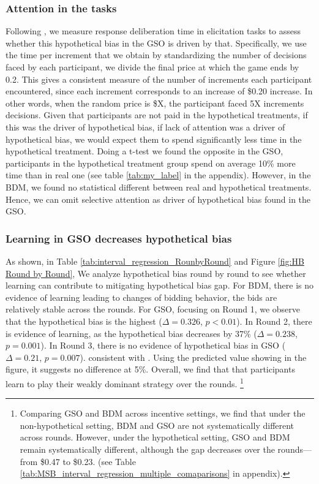 \documentclass[12pt]{article}
\begin{document}
\subsubsection{Attention in the tasks}

Following \citet{chabris2008measuring}, we measure response deliberation time in elicitation tasks to assess whether this hypothetical bias in the GSO is driven by that. Specifically, we use the time per increment that we obtain by standardizing the number of decisions faced by each participant, we divide the final price at which the game ends by 0.2. This gives a consistent measure of the number of increments each participant encountered, since each increment corresponds to an increase of \$0.20 increase. In other words, when the random price is \$X, the participant faced 5X increments decisions. Given that participants are not paid in the hypothetical treatments, if this was the driver of hypothetical bias, if lack of attention was a driver of hypothetical bias, we would expect them to spend significantly less time in the hypothetical treatment. Doing a t-test we found the opposite in the GSO, participants in the hypothetical treatment group spend on average 10\% more time than in real one (see table \ref{tab:my_label} in the appendix).  However, in the BDM, we found no statistical different between real and hypothetical treatments. Hence, we can omit selective attention as driver of hypothetical bias found in the GSO.










\subsubsection{Learning in GSO decreases hypothetical bias}
As shown, in Table \ref{tab:interval_regression_RounbyRound} and Figure \ref{fig:HB Round by Round}, We analyze hypothetical bias round by round to see whether learning can contribute to mitigating hypothetical bias gap. For BDM, there is no evidence of learning leading to changes of bidding behavior, the bids are relatively stable across the rounds.
For GSO, focusing on Round 1, we observe that the hypothetical bias is the highest (\(\Delta = 0.326\), \(p < 0.01\)). In Round 2, there is evidence of learning, as the hypothetical bias decreases by 37\% (\(\Delta = 0.238\), \(p = 0.001\)). In Round 3, there is no evidence of hypothetical bias in GSO (\(\Delta = 0.21\), \(p = 0.007\)). consistent with \citet{brown_is_2023}. Using the predicted value showing in the figure, it suggests no difference at 5\%. Overall, we find that that participants learn to play their weakly dominant strategy over the rounds. \footnote{Comparing GSO and BDM across incentive settings, we find that under the non-hypothetical setting, BDM and GSO are not systematically different across rounds. However, under the hypothetical setting, GSO and BDM remain systematically different, although the gap decreases over the rounds—from \$0.47 to \$0.23. (see Table \ref{tab:MSB_interval_regression_multiple_comaparisons} in appendix).}
\end{document}
